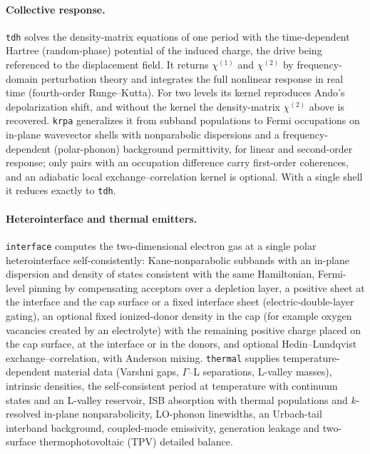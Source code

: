 \documentclass[11pt]{article}
\newcommand{\chitwo}{\chi^{(2)}}
\newcommand{\code}[1]{\texttt{#1}}
\begin{document}
\paragraph{Collective response.} \code{tdh} solves the density-matrix equations of one period with the time-dependent Hartree (random-phase) potential of the induced charge, the drive being referenced to the displacement field. It returns $\chi^{(1)}$ and $\chitwo$ by frequency-domain perturbation theory and integrates the full nonlinear response in real time (fourth-order Runge--Kutta). For two levels its kernel reproduces Ando's depolarization shift, and without the kernel the density-matrix $\chitwo$ above is recovered. \code{krpa} generalizes it from subband populations to Fermi occupations on in-plane wavevector shells with nonparabolic dispersions and a frequency-dependent (polar-phonon) background permittivity, for linear and second-order response; only pairs with an occupation difference carry first-order coherences, and an adiabatic local exchange--correlation kernel is optional. With a single shell it reduces exactly to \code{tdh}.

\paragraph{Heterointerface and thermal emitters.} \code{interface} computes the two-dimensional electron gas at a single polar heterointerface self-consistently: Kane-nonparabolic subbands with an in-plane dispersion and density of states consistent with the same Hamiltonian, Fermi-level pinning by compensating acceptors over a depletion layer, a positive sheet at the interface and the cap surface or a fixed interface sheet (electric-double-layer gating), an optional fixed ionized-donor density in the cap (for example oxygen vacancies created by an electrolyte) with the remaining positive charge placed on the cap surface, at the interface or in the donors, and optional Hedin--Lundqvist exchange--correlation, with Anderson mixing. \code{thermal} supplies temperature-dependent material data (Varshni gaps, $\Gamma$--L separations, L-valley masses), intrinsic densities, the self-consistent period at temperature with continuum states and an L-valley reservoir, ISB absorption with thermal populations and $k$-resolved in-plane nonparabolicity, LO-phonon linewidths, an Urbach-tail interband background, coupled-mode emissivity, generation leakage and two-surface thermophotovoltaic (TPV) detailed balance.
\end{document}
